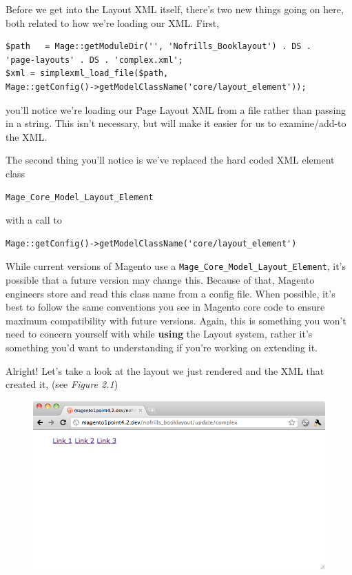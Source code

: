 \documentclass[oneside]{book}
\begin{document}
Before we get into the Layout XML itself, there's two new things going on here, both related to how we're loading our XML. First,

\begin{lstlisting}
$path   = Mage::getModuleDir('', 'Nofrills_Booklayout') . DS .
'page-layouts' . DS . 'complex.xml';
$xml = simplexml_load_file($path,
Mage::getConfig()->getModelClassName('core/layout_element'));

\end{lstlisting}


you'll notice we're loading our Page Layout XML from a file rather than passing in a string.  This isn't necessary, but will make it easier for us to examine/add-to the XML.

The second thing you'll notice is we've replaced the hard coded XML element class

\begin{lstlisting}
Mage_Core_Model_Layout_Element

\end{lstlisting}


with a call to

\begin{lstlisting}
Mage::getConfig()->getModelClassName('core/layout_element')

\end{lstlisting}


While current versions of Magento use a \footnotesize\texttt{Mage\_Core\_Model\_Layout\_Element}\normalsize, it's possible that a future version may change this.  Because of that, Magento engineers store and read this class name from a config file.  When possible, it's best to follow the same conventions you see in Magento core code to ensure maximum compatibility with future versions.  Again, this is something you won't need to concern yourself with while \textbf{using} the Layout system, rather it's something you'd want to understanding if you're working on extending it.

Alright!  Let's take a look at the layout we just rendered and the XML that created it, (see \emph{Figure 2.1})

\begin{figure}[htb]
\begin{center}
\leavevmode
\includegraphics[width=1\textwidth]{images/chapter2/complex.png}
\end{center}
\caption{}
\end{figure}
\end{document}
